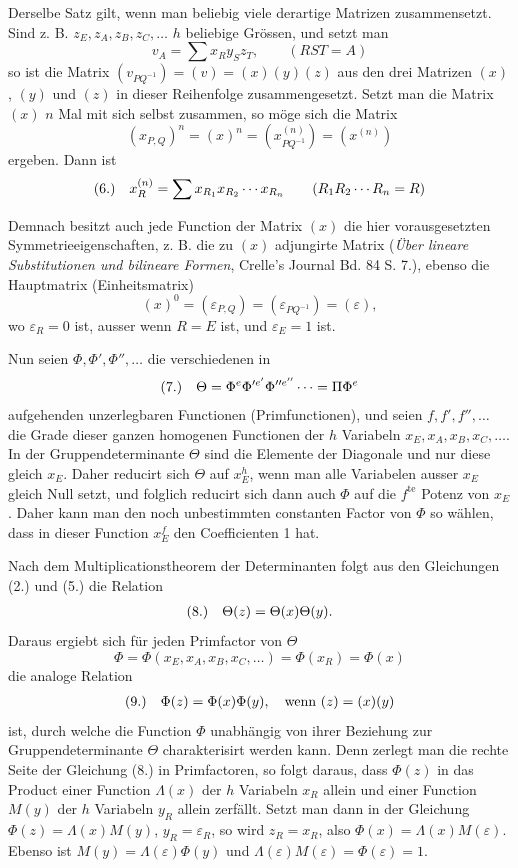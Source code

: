 \documentclass[11pt]{article}
\makeatletter
\newcommand{\frobtagc}[2]{\[\begin{array}{@{}r@{\quad}c@{}}\textup{(#1)} & \displaystyle #2\end{array}\]}
\makeatother
\begin{document}
Derselbe Satz gilt, wenn man beliebig viele derartige Matrizen zusammensetzt. Sind z. B. $z_E,z_A,z_B,z_C,\ldots$ $h$ beliebige Grössen, und setzt man
\[
v_A=\sum x_Ry_Sz_T,\qquad (RST=A)
\]
so ist die Matrix $(v_{PQ^{-1}})=(v)=(x)(y)(z)$ aus den drei Matrizen $(x)$, $(y)$ und $(z)$ in dieser Reihenfolge zusammengesetzt. Setzt man die Matrix $(x)$ $n$ Mal mit sich selbst zusammen, so möge sich die Matrix
\[
(x_{P,Q})^n=(x)^n=(x_{PQ^{-1}}^{(n)})=(x^{(n)})
\]
ergeben. Dann ist
\frobtagc{6.}{x_R^{(n)}=\sum x_{R_1}x_{R_2}\cdots x_{R_n}\qquad (R_1R_2\cdots R_n=R)}

Demnach besitzt auch jede Function der Matrix $(x)$ die hier vorausgesetzten Symmetrieeigenschaften, z. B. die zu $(x)$ adjungirte Matrix (\emph{Über lineare Substitutionen und bilineare Formen}, Crelle's Journal Bd. 84 S. 7.), ebenso die Hauptmatrix (Einheitsmatrix)
\[
(x)^0=(\varepsilon_{P,Q})=(\varepsilon_{PQ^{-1}})=(\varepsilon),
\]
wo $\varepsilon_R=0$ ist, ausser wenn $R=E$ ist, und $\varepsilon_E=1$ ist.

Nun seien $\Phi,\Phi',\Phi'',\ldots$ die verschiedenen in
\frobtagc{7.}{\Theta=\Phi^e\Phi'^{e'}\Phi''^{e''}\cdots=\Pi\Phi^e}
aufgehenden unzerlegbaren Functionen (Primfunctionen), und seien $f,f',f'',\ldots$ die Grade dieser ganzen homogenen Functionen der $h$ Variabeln $x_E,x_A,x_B,x_C,\ldots$. In der Gruppendeterminante $\Theta$ sind die Elemente der Diagonale und nur diese gleich $x_E$. Daher reducirt sich $\Theta$ auf $x_E^h$, wenn man alle Variabelen ausser $x_E$ gleich Null setzt, und folglich reducirt sich dann auch $\Phi$ auf die $f^{\mathrm{te}}$ Potenz von $x_E$. Daher kann man den noch unbestimmten constanten Factor von $\Phi$ so wählen, dass in dieser Function $x_E^f$ den Coefficienten 1 hat.

Nach dem Multiplicationstheorem der Determinanten folgt aus den Gleichungen (2.) und (5.) die Relation
\frobtagc{8.}{\Theta(z)=\Theta(x)\Theta(y).}
Daraus ergiebt sich für jeden Primfactor von $\Theta$
\[
\Phi=\Phi(x_E,x_A,x_B,x_C,\ldots)=\Phi(x_R)=\Phi(x)
\]
die analoge Relation
\frobtagc{9.}{\Phi(z)=\Phi(x)\Phi(y),\quad \text{wenn }(z)=(x)(y)}
ist, durch welche die Function $\Phi$ unabhängig von ihrer Beziehung zur Gruppendeterminante $\Theta$ charakterisirt werden kann. Denn zerlegt man die rechte Seite der Gleichung (8.) in Primfactoren, so folgt daraus, dass $\Phi(z)$ in das Product einer Function $\Lambda(x)$ der $h$ Variabeln $x_R$ allein und einer Function $M(y)$ der $h$ Variabeln $y_R$ allein zerfällt. Setzt man dann in der Gleichung $\Phi(z)=\Lambda(x)M(y)$, $y_R=\varepsilon_R$, so wird $z_R=x_R$, also $\Phi(x)=\Lambda(x)M(\varepsilon)$. Ebenso ist $M(y)=\Lambda(\varepsilon)\Phi(y)$ und $\Lambda(\varepsilon)M(\varepsilon)=\Phi(\varepsilon)=1$.
\end{document}
